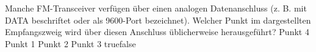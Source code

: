    {Manche FM-Transceiver verfügen über einen analogen Datenanschluss (z. B. mit DATA beschriftet oder als 9600-Port bezeichnet). Welcher Punkt im dargestellten Empfangszweig wird über diesen Anschluss üblicherweise herausgeführt?}
    {Punkt 4}
    {Punkt 1}
    {Punkt 2}
    {Punkt 3}
    {true}{false}